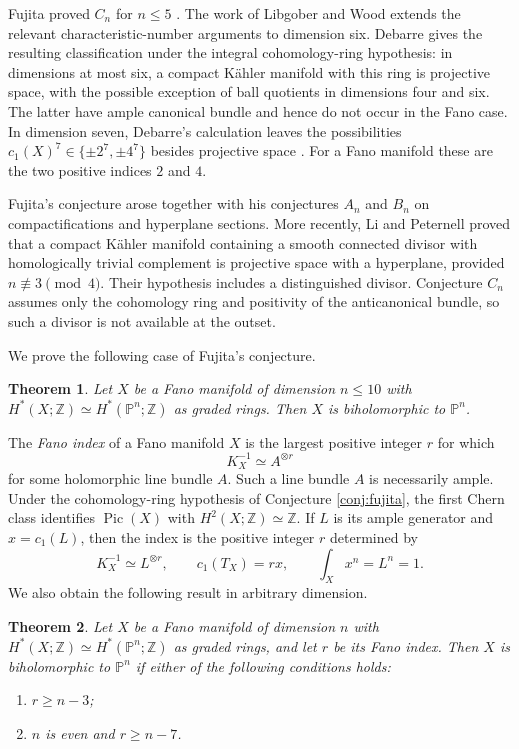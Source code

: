 \documentclass[11pt,reqno,letterpaper]{amsart}
\newcommand{\Z}{\mathbb Z}
\newcommand{\PP}{\mathbb P}
\newcommand{\Pic}{\operatorname{Pic}}
\newtheorem{theorem}{Theorem}[section]
\theoremstyle{definition}
\numberwithin{equation}{section}
\begin{document}
Fujita proved $C_n$ for $n\le5$ \cite[Theorem 1]{fujita}.
The work of Libgober and Wood \cite{lw} extends the relevant
characteristic-number arguments to dimension six. Debarre
\cite[Theorem 2]{debarre} gives the resulting classification under the
integral cohomology-ring hypothesis: in dimensions at most six, a compact
K\"ahler manifold with this ring is projective space, with the possible
exception of ball quotients in dimensions four and six. The latter have
ample canonical bundle and hence do not occur in the Fano case.
In dimension seven, Debarre's calculation leaves the possibilities
$c_1(X)^7\in\{\pm2^7,\pm4^7\}$ besides projective space
\cite[Theorem 10]{debarre}. For a Fano manifold these are the two positive
indices $2$ and $4$.

Fujita's conjecture arose together with his conjectures $A_n$ and $B_n$
on compactifications and hyperplane sections. More recently, Li and
Peternell \cite{lp} proved that a compact K\"ahler manifold containing a
smooth connected divisor with homologically trivial complement is
projective space with a hyperplane, provided $n\not\equiv3\pmod4$.
Their hypothesis includes a distinguished divisor. Conjecture $C_n$
assumes only the cohomology ring and positivity of the anticanonical
bundle, so such a divisor is not available at the outset.

We prove the following case of Fujita's conjecture.

\begin{theorem}\label{thm:dimension}
Let $X$ be a Fano manifold of dimension $n\le10$ with
$H^*(X;\Z)\simeq H^*(\PP^n;\Z)$ as graded rings.
Then $X$ is biholomorphic to $\PP^n$.
\end{theorem}

The \emph{Fano index} of a Fano manifold $X$ is the
largest positive integer $r$ for which
\[
 K_X^{-1}\simeq A^{\otimes r}
\]
for some holomorphic line bundle $A$. Such a line bundle $A$ is
necessarily ample. Under the cohomology-ring hypothesis of Conjecture
\ref{conj:fujita}, the first Chern class identifies $\Pic(X)$ with
$H^2(X;\Z)\simeq\Z$. If $L$ is its ample generator and $x=c_1(L)$,
then the index is the positive integer $r$ determined by
\[
 K_X^{-1}\simeq L^{\otimes r},\qquad c_1(T_X)=rx,
 \qquad \int_Xx^n=L^n=1.
\]
We also obtain the following result in arbitrary dimension.

\begin{theorem}\label{thm:index}
Let $X$ be a Fano manifold of dimension $n$ with
$H^*(X;\Z)\simeq H^*(\PP^n;\Z)$ as graded rings, and let $r$ be its
Fano index. Then $X$ is biholomorphic to $\PP^n$ if either of the following
conditions holds:
\begin{enumerate}[label=\textup{(\roman*)}]
\item $r\ge n-3$;
\item $n$ is even and $r\ge n-7$.
\end{enumerate}
\end{theorem}
\end{document}
